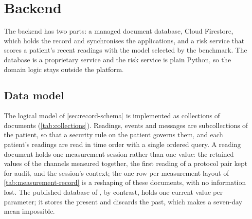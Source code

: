 
\section{Backend}\label{sec:backend}\label{sec:tree-property}\label{sec:schema-counterexample}\label{sec:schema-design}\label{sec:key-design}

The backend has two parts: a managed document database, Cloud Firestore, which holds the record and synchronises the applications, and a risk service that scores a patient's recent readings with the model selected by the benchmark. The database is a proprietary service and the risk service is plain Python, so the domain logic stays outside the platform.

\subsection{Data model}\label{sec:firestore-model}

The logical model of \cref{sec:record-schema} is implemented as collections of documents (\cref{tab:collections}). Readings, events and messages are subcollections of the patient, so that a security rule on the patient governs them, and each patient's readings are read in time order with a single ordered query. A reading document holds one measurement session rather than one value: the retained values of the channels measured together, the first reading of a protocol pair kept for audit, and the session's context; the one-row-per-measurement layout of \cref{tab:measurement-record} is a reshaping of these documents, with no information lost. The published database of \textcite{efendi2025}, by contrast, holds one current value per parameter; it stores the present and discards the past, which makes a seven-day mean impossible.

